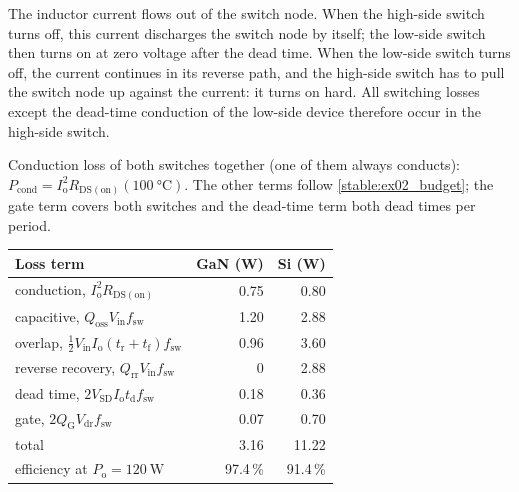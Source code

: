 
\begin{solutionblock}
	The inductor current flows out of the switch node. When the high-side switch turns off, this current discharges the switch node by itself; the low-side switch then turns on at zero voltage after the dead time. When the low-side switch turns off, the current continues in its reverse path, and the high-side switch has to pull the switch node up against the current: it turns on hard. All switching losses except the dead-time conduction of the low-side device therefore occur in the high-side switch.
\end{solutionblock}


\begin{solutionblock}
	Conduction loss of both switches together (one of them always conducts): $P_\mathrm{cond}=I_\mathrm{o}^2R_\mathrm{DS(on)}(\SI{100}{\celsius})$. The other terms follow \autoref{stable:ex02_budget}; the gate term covers both switches and the dead-time term both dead times per period.
	\begin{solutiontable}[ht]
		\centering
		\begin{tabular}{lrr}
			\toprule
			Loss term                                                   & GaN (W) & Si (W) \\
			\midrule
			conduction, $I_\mathrm{o}^2R_\mathrm{DS(on)}$                & 0.75    & 0.80   \\
			capacitive, $Q_\mathrm{oss}V_\mathrm{in}f_\mathrm{sw}$       & 1.20    & 2.88   \\
			overlap, $\frac{1}{2}V_\mathrm{in}I_\mathrm{o}(t_\mathrm{r}+t_\mathrm{f})f_\mathrm{sw}$ & 0.96 & 3.60 \\
			reverse recovery, $Q_\mathrm{rr}V_\mathrm{in}f_\mathrm{sw}$  & 0       & 2.88   \\
			dead time, $2V_\mathrm{SD}I_\mathrm{o}t_\mathrm{d}f_\mathrm{sw}$ & 0.18 & 0.36   \\
			gate, $2Q_\mathrm{G}V_\mathrm{dr}f_\mathrm{sw}$              & 0.07    & 0.70   \\
			\midrule
			total                                                        & 3.16    & 11.22  \\
			efficiency at $P_\mathrm{o}=\SI{120}{\watt}$                 & 97.4\,\% & 91.4\,\% \\
			\bottomrule
		\end{tabular}
		\caption{Loss budget at 1\,MHz.}
		\label{stable:ex02_budget}
	\end{solutiontable}
\end{solutionblock}

